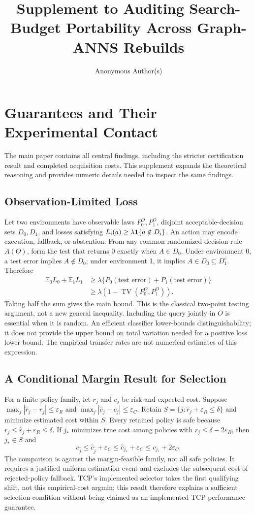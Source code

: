\documentclass[sigconf,anonymous]{acmart}
\title{Supplement to Auditing Search-Budget Portability Across Graph-ANNS Rebuilds}
\author{Anonymous Author(s)}
\begin{document}
\maketitle
\appendix
\section{Guarantees and Their Experimental Contact}
The main paper contains all central findings, including the stricter certification result and completed acquisition costs. This supplement expands the theoretical reasoning and provides numeric details needed to inspect the same findings.

\subsection{Observation-Limited Loss}
Let two environments have observable laws $P_0^O,P_1^O$, disjoint acceptable-decision sets $D_0,D_1$, and losses satisfying $L_i(a)\ge\lambda\mathbf{1}\{a\notin D_i\}$. An action may encode execution, fallback, or abstention. From any common randomized decision rule $A(O)$, form the test that returns 0 exactly when $A\in D_0$. Under environment 0, a test error implies $A\notin D_0$; under environment 1, it implies $A\in D_0\subseteq D_1^c$. Therefore
\begin{align*}
 \mathbb E_0L_0+\mathbb E_1L_1
 &\ge\lambda\{P_0(\text{test error})+P_1(\text{test error})\}\\
 &\ge\lambda(1-\operatorname{TV}(P_0^O,P_1^O)).
\end{align*}
Taking half the sum gives the main bound. This is the classical two-point testing argument, not a new general inequality. Including the query jointly in $O$ is essential when it is random. An efficient classifier lower-bounds distinguishability; it does not provide the upper bound on total variation needed for a positive loss lower bound. The empirical transfer rates are not numerical estimates of this expression.

\subsection{A Conditional Margin Result for Selection}
For a finite policy family, let $r_j$ and $c_j$ be risk and expected cost. Suppose $\max_j|\hat r_j-r_j|\le\varepsilon_R$ and $\max_j|\hat c_j-c_j|\le\varepsilon_C$. Retain $S=\{j:\hat r_j+\varepsilon_R\le\delta\}$ and minimize estimated cost within $S$. Every retained policy is safe because $r_j\le\hat r_j+\varepsilon_R\le\delta$. If $j_*$ minimizes true cost among policies with $r_j\le\delta-2\varepsilon_R$, then $j_*\in S$ and
\[
 c_{\hat j}\le\hat c_{\hat j}+\varepsilon_C
 \le\hat c_{j_*}+\varepsilon_C\le c_{j_*}+2\varepsilon_C.
\]
The comparison is against the margin-feasible family, not all safe policies. It requires a justified uniform estimation event and excludes the subsequent cost of rejected-policy fallback. TCP's implemented selector takes the first qualifying shift, not this empirical-cost argmin; this result therefore explains a sufficient selection condition without being claimed as an implemented TCP performance guarantee.
\end{document}
